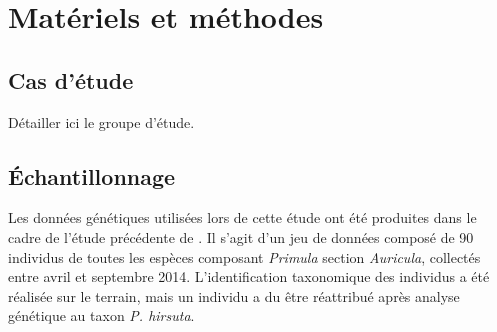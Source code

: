 
\section{Matériels et méthodes}

\subsection{Cas d'étude}

Détailler ici le groupe d'étude.

\subsection{Échantillonnage}

Les données génétiques utilisées lors de cette étude ont été produites dans le cadre de l'étude précédente de \citet{Boucher2016a}.
 Il s'agit d'un jeu de données composé de 90 individus de toutes les espèces composant \textit{Primula} section \textit{Auricula}, collectés entre avril et septembre 2014.
 L'identification taxonomique des individus a été réalisée sur le terrain, mais un individu a du être réattribué après analyse génétique au taxon \textit{P. hirsuta}.


